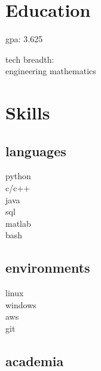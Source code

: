 
\begin{minipage}[t]{0.22\textwidth} %

\section{Education} 
\vspace{\topsep} %
\vspace{1pt}
\begin{tightitemize}
\item gpa: 3.625
\item tech breadth:\\engineering mathematics
\end{tightitemize}
\vspace{6pt}

\section{Skills}
\subsection{languages}
\normalsize
python \\
c/c++ \\
java \\
sql \\
matlab \\
bash
\sectionspace

\subsection{environments}
linux \\
windows \\
aws \\
git \\
\sectionspace


\subsection{academia}



\end{minipage}
